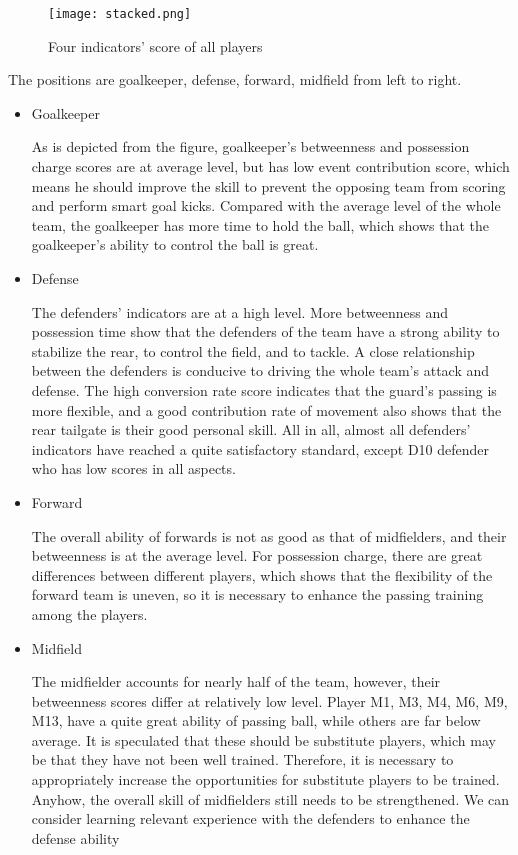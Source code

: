 \documentclass{mcmthesis}
\begin{document}
{\begin{figure}[h]
\small
\centering
\texttt{[image: stacked.png]}
\caption{Four indicators' score of all players} \label{fig:aa}
\end{figure}

The positions are goalkeeper, defense, forward, midfield from left to right.

\begin{itemize}
\item Goalkeeper 

As is depicted from the figure, goalkeeper's betweenness and possession charge scores are at average level, but has low event contribution score, which means he should improve the skill to prevent the opposing team from scoring and perform smart goal kicks. Compared with the average level of the whole team, the goalkeeper has more time to hold the ball, which shows that the goalkeeper's ability to control the ball is  great.

\item Defense

The defenders' indicators are at a high level. More betweenness and possession time show that the defenders of the team have a strong ability to stabilize the rear, to control the field, and to tackle. A close relationship between the defenders is conducive to driving the whole team's attack and defense. The high conversion rate score indicates that the guard's passing is more flexible, and a good contribution rate of movement also shows that the rear tailgate is their good personal skill. All in all, almost all defenders' indicators have reached a quite satisfactory standard, except D10 defender who has low scores in all aspects.


\item Forward

The overall ability of forwards is not as good as that of midfielders, and their betweenness is at the average level. For possession charge, there are great differences between different players, which shows that the flexibility of the forward team is uneven, so it is necessary to enhance the passing training among the players.


\item Midfield

The midfielder accounts for nearly half of the team, however, their betweenness scores differ at relatively low level. Player M1, M3, M4, M6, M9, M13, have a quite great ability of passing ball, while others are far below average. It is speculated that these should be substitute players, which may be that they have not been well trained. Therefore, it is necessary to appropriately increase the opportunities for substitute players to be trained. Anyhow, the overall skill of midfielders still needs to be strengthened. We can consider learning relevant experience with the defenders to enhance the defense ability
\end{itemize}

}
\end{document}
